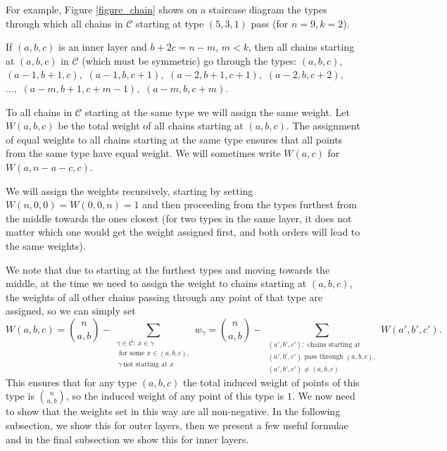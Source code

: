 \documentclass[11pt, reqno]{amsart}
\numberwithin{equation}{section}
\begin{document}
For example, Figure \ref{figure_chain} shows on a staircase diagram the types through which all chains in $\mathcal{C}$ starting at type $(5, 3, 1)$ pass (for $n=9, k=2$).

If $(a, b, c)$ is an inner layer and $b+2c=n-m$, $m<k$, then all chains starting at $(a, b, c)$ in $\mathcal{C}$ (which must be symmetric) go through the types: $(a, b, c),$ $(a-1, b+1, c),$ $(a-1, b, c+1),$ $(a-2, b+1, c+1),$ $(a-2, b, c+2),$ $\dots,$ $(a-m, b+1, c+m-1),$ $(a-m, b, c+m).$

To all chains in $\mathcal{C}$ starting at the same type we will assign the same weight. Let $W(a, b, c)$ be the total weight of all chains starting at $(a, b, c)$. The assignment of equal weights to all chains starting at the same type ensures that all points from the same type have equal weight. We will sometimes write $W(a, c)$ for $W(a, n-a-c, c)$.

We will assign the weights recursively, starting by setting $W(n, 0, 0)=W(0, 0, n)=1$ and then proceeding from the types furthest from the middle towards the ones closest (for two types in the same layer, it does not matter which one would get the weight assigned first, and both orders will lead to the same weights).

We note that due to starting at the furthest types and moving towards the middle, at the time we need to assign the weight to chains starting at $(a, b, c)$, the weights of all other chains passing through any point of that type are assigned, so we can simply set
\begin{equation}
    W(a, b, c) = \binom{n}{a, b} - \sum_{\substack{\gamma \in \mathcal{C}: \ x \in \gamma \\
    \text{ for some $x \in (a, b, c)$},\\
    \ \gamma \ \text{not starting at $x$}}} w_{\gamma} = \binom{n}{a, b} - \sum_{\substack{(a', b', c'): \text{ chains starting at } \\ \text{$(a', b', c')$ pass through $(a, b, c)$}, \\ (a', b', c') \neq (a, b, c)}} W(a', b', c').
\end{equation}
This ensures that for any type $(a, b, c)$ the total induced weight of points of this type is $\binom{n}{a, b}$, so the induced weight of any point of this type is $1$. We now need to show that the weights set in this way are all non-negative. In the following subsection, we show this for outer layers, then we present a few useful formulae and in the final subsection we show this for inner layers.
\end{document}
